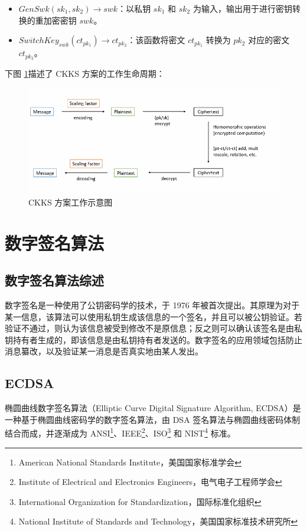 \begin{itemize}
    \item $GenSwk(sk_1, sk_2) \rightarrow swk$：以私钥 $sk_1$ 和 $sk_2$ 为输入，输出用于进行密钥转换的重加密密钥 $swk$。
    \item $SwitchKey_{swk}(ct_{pk_1}) \rightarrow ct_{pk_2}$：该函数将密文 $ct_{pk_1}$ 转换为 $pk_2$ 对应的密文 $ct_{pk_2}$。
\end{itemize}

下图\cite{ckksIntroduct} \ref*{Fig:CKKS}描述了 CKKS 方案的工作生命周期：

\begin{figure}[ht]
    \centering
    \includegraphics[width=0.8\linewidth]{./Figures/CKKS_Diagram.png}
    \caption{CKKS 方案工作示意图}\label{Fig:CKKS}
\end{figure}

\section{数字签名算法}

\subsection{数字签名算法综述}

数字签名是一种使用了公钥密码学的技术，于 1976 年被首次提出\cite{1055638}。其原理为对于某一信息，该算法可以使用私钥生成该信息的一个签名，并且可以被公钥验证。若验证不通过，则认为该信息被受到修改不是原信息；反之则可以确认该签名是由私钥持有者生成的，即该信息是由私钥持有者发送的。数字签名的应用领域包括防止消息纂改，以及验证某一消息是否真实地由某人发出。

\subsection{ECDSA}

椭圆曲线数字签名算法（Elliptic Curve Digital Signature Algorithm, ECDSA）是一种基于椭圆曲线密码学的数字签名算法，由 DSA 签名算法与椭圆曲线密码体制结合而成，并逐渐成为 ANSI\footnote{American National Standards Institute，美国国家标准学会}、IEEE\footnote{Institute of Electrical and Electronics Engineers，电气电子工程师学会}、ISO\footnote{International Organization for Standardization，国际标准化组织} 和 NIST\footnote{National Institute of Standards and Technology，美国国家标准技术研究所} 标准\cite{ecdsa_blockchain}。 


